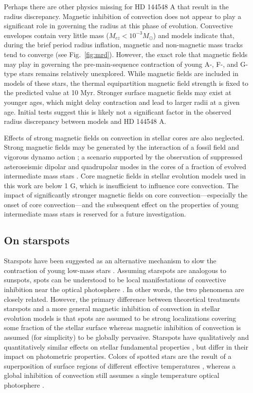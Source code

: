 \documentclass{aa}
\begin{document}
Perhaps there are other physics missing for HD 144548 A that result in the radius discrepancy. Magnetic inhibition of convection does not appear to play a significant role in governing the radius at this phase of evolution. Convective envelopes contain very little mass ($M_{cz} < 10^{-3} M_{\odot}$) and models indicate that, during the brief period radius inflation, magnetic and non-magnetic mass tracks tend to converge (see Fig.~\ref{fig:mrd}). However, the exact role that magnetic fields may play in governing the pre-main-sequence contraction of young A-, F-, and G-type stars remains relatively unexplored. While magnetic fields are included in models of these stars, the thermal equipartition magnetic field strength is fixed to the predicted value at 10 Myr. Stronger surface magnetic fields may exist at younger ages, which might delay contraction and lead to larger radii at a given age. Initial tests suggest this is likely not a significant factor in the observed radius discrepancy between models and HD 144548 A.

Effects of strong magnetic fields on convection in stellar cores are also neglected. Strong magnetic fields may be generated by the interaction of a fossil field and vigorous dynamo action \citep[e.g.,][]{Featherstone2009}; a scenario supported by the observation of suppressed asteroseismic dipolar and quadrupolar modes in the cores of a fraction of evolved intermediate mass stars \citep{Fuller2015,Stello2016a,Cantiello2016}. Core magnetic fields in stellar evolution models used in this work are below 1 G, which is insufficient to influence core convection. The impact of significantly stronger magnetic fields on core convection---especially the onset of core convection---and the subsequent effect on the properties of young intermediate mass stars is reserved for a future investigation. 

\subsection{On starspots}
Starspots have been suggested as an alternative mechanism to slow the contraction of young low-mass stars \citep{Jackson2009, MM10, Jackson2014a, Somers2015b}. Assuming starspots are analogous to sunspots, spots can be understood to be local manifestations of convective inhibition near the optical photosphere \citep{Biermann1941,Deinzer1965}. In other words, the two phenomena are closely related. However, the primary difference between theoretical treatments starspots and a more general magnetic inhibition of convection in stellar evolution models is that spots are assumed to be strong localizations covering some fraction of the stellar surface whereas magnetic inhibition of convection is assumed (for simplicity) to be globally pervasive. Starspots have qualitatively and quantitatively similar effects on stellar fundamental properties \citep[radius, \teff, luminosity;][]{Spruit1982a,Spruit1986,Somers2015b}, but differ in their impact on photometric properties. Colors of spotted stars are the result of a superposition of surface regions of different effective temperatures \citep{Spruit1986}, whereas a global inhibition of convection still assumes a single temperature optical photosphere \citep{Jackson2014a}.
\end{document}
